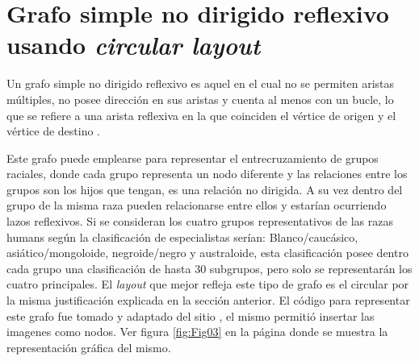 \documentclass{article}
\begin{document}
\section{Grafo simple no dirigido reflexivo usando \textit{circular layout}}

Un grafo simple no dirigido reflexivo es aquel en el cual no se permiten aristas múltiples, no posee dirección en sus aristas y cuenta al menos con un bucle, lo que se refiere a una arista reflexiva en la que coinciden el vértice de origen y el vértice de destino \cite{Elisa}. 

Este grafo puede emplearse para representar el entrecruzamiento de grupos raciales, donde cada grupo representa un nodo diferente y las relaciones entre los grupos son los hijos que tengan, es una relación no dirigida. A su vez dentro del grupo de la misma raza pueden relacionarse entre ellos y estarían ocurriendo lazos reflexivos. Si se consideran los cuatro grupos representativos de las razas humans según la clasificación de especialistas serían: Blanco/caucásico, asiático/mongoloide, negroide/negro y australoide, esta clasificación posee dentro cada grupo una clasificación de hasta 30 subgrupos, pero solo se representarán los cuatro principales. El \textit{layout} que mejor refleja este tipo de grafo es el circular por la misma justificación explicada en la sección anterior. El código para representar este grafo fue tomado y adaptado del sitio \cite{codimag}, el mismo permitió insertar las imagenes como nodos. Ver figura \ref{fig:Fig03} en la página \pageref{fig:Fig03} donde se muestra la representación gráfica del mismo.
\newpage

\end{document}
